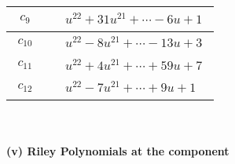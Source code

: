 \documentclass[1p]{elsarticle_modified}
\theoremstyle{definition}
\begin{document}
\begin{tabular}{m{50pt}|m{274pt}}
\hline $$\begin{aligned}c_{9}\end{aligned}$$&$\begin{aligned}
&u^{22}+31 u^{21}+\cdots-6 u+1
\end{aligned}$\\
\hline $$\begin{aligned}c_{10}\end{aligned}$$&$\begin{aligned}
&u^{22}-8 u^{21}+\cdots-13 u+3
\end{aligned}$\\
\hline $$\begin{aligned}c_{11}\end{aligned}$$&$\begin{aligned}
&u^{22}+4 u^{21}+\cdots+59 u+7
\end{aligned}$\\
\hline $$\begin{aligned}c_{12}\end{aligned}$$&$\begin{aligned}
&u^{22}-7 u^{21}+\cdots+9 u+1
\end{aligned}$\\
\hline
\end{tabular}\\~\\
\newpage\renewcommand{\arraystretch}{1}
\flushleft \textbf{(v) Riley Polynomials at the component}\newline \\
\end{document}
